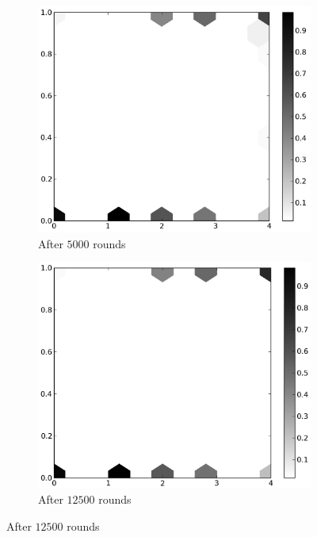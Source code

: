 \documentclass{amsart}
\begin{document}
\begin{figure}[h!tbp]
  \begin{subfigure}{.31\linewidth}
    \centering
    \includegraphics[width=\linewidth]{varyN5000.png}
    \caption{After $5000$ rounds}
    \label{fig:varyN5000}
  \end{subfigure}
  \hspace{.01\linewidth}
  \begin{subfigure}{.31\linewidth}
    \centering
    \includegraphics[width=\linewidth]{varyN12500.png}
    \caption{After $12500$ rounds}

\end{subfigure}
\end{figure}
\end{document}
